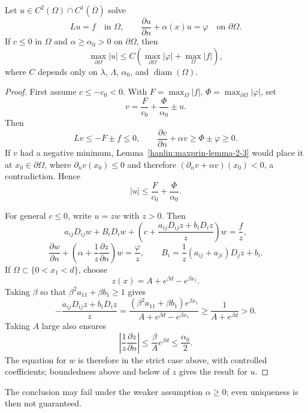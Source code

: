 \begin{theorem}\label{hanlin:maxprin-theorem-2-25}
Let $u\in C^2(\Omega)\cap C^1(\overline\Omega)$ solve
\[
Lu=f\quad\text{in }\Omega,
\qquad
\frac{\partial u}{\partial n}+\alpha(x)u=\varphi
\quad\text{on }\partial\Omega.
\]
If $c\le0$ in $\Omega$ and $\alpha\ge\alpha_0>0$ on $\partial\Omega$, then
\[
\max_{\partial\Omega}|u|
\le C\left(\max_{\partial\Omega}|\varphi|+\max_\Omega|f|\right),
\]
where $C$ depends only on $\lambda$, $\Lambda$, $\alpha_0$, and
$\operatorname{diam}(\Omega)$.
\end{theorem}
\begin{proof}
\sketch First assume $c\le-c_0<0$. With
$F=\max_\Omega|f|$, $\Phi=\max_{\partial\Omega}|\varphi|$, set
\[
v=\frac{F}{c_0}+\frac{\Phi}{\alpha_0}\pm u.
\]
Then
\[
Lv\le-F\pm f\le0,
\qquad
\frac{\partial v}{\partial n}+\alpha v\ge\Phi\pm\varphi\ge0.
\]
If $v$ had a negative minimum, Lemma~\ref{hanlin:maxprin-lemma-2-3} would place
it at $x_0\in\partial\Omega$, where $\partial_nv(x_0)\le0$ and therefore
$(\partial_nv+\alpha v)(x_0)<0$, a contradiction. Hence
\[
|u|\le\frac{F}{c_0}+\frac{\Phi}{\alpha_0}.
\]

For general $c\le0$, write $u=zw$ with $z>0$. Then
\[
a_{ij}D_{ij}w+B_iD_iw+
\left(c+\frac{a_{ij}D_{ij}z+b_iD_iz}{z}\right)w=\frac fz,
\]
\[
\frac{\partial w}{\partial n}
+\left(\alpha+\frac1z\frac{\partial z}{\partial n}\right)w
=\frac\varphi z,
\qquad
B_i=\frac1z(a_{ij}+a_{ji})D_jz+b_i.
\]
If $\Omega\subset\{0<x_1<d\}$, choose
\[
z(x)=A+e^{\beta d}-e^{\beta x_1}.
\]
Taking $\beta$ so that $\beta^2a_{11}+\beta b_1\ge1$ gives
\[
-\frac{a_{ij}D_{ij}z+b_iD_iz}{z}
=\frac{(\beta^2a_{11}+\beta b_1)e^{\beta x_1}}
{A+e^{\beta d}-e^{\beta x_1}}
\ge\frac1{A+e^{\beta d}}>0.
\]
Taking $A$ large also ensures
\[
\left|\frac1z\frac{\partial z}{\partial n}\right|
\le\frac\beta A e^{\beta d}\le\frac{\alpha_0}{2}.
\]
The equation for $w$ is therefore in the strict case above, with controlled
coefficients; boundedness above and below of $z$ gives the result for $u$.
\end{proof}

\begin{remark}\label{hanlin:maxprin-remark-2-26}
The conclusion may fail under the weaker assumption $\alpha\ge0$; even
uniqueness is then not guaranteed.
\end{remark}

